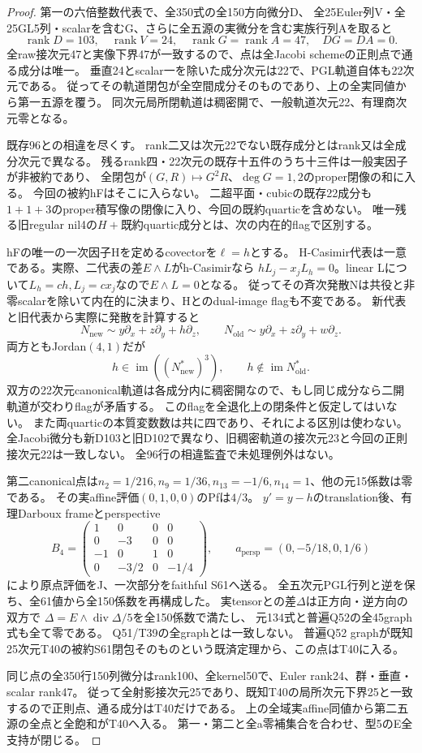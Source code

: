 \documentclass[a4paper,11pt]{ltjsarticle}
\theoremstyle{definition}
\begin{document}
\begin{proof}
第一の六倍整数代表で、全350式の全150方向微分D、
全25Euler列V・全25GL5列・scalarを含むG、さらに全五源の実微分を含む実族行列Aを取ると
\[
 \operatorname{rank}D=103,\quad\operatorname{rank}V=24,\quad
 \operatorname{rank}G=\operatorname{rank}A=47,\quad DG=DA=0.
\]
全raw接次元47と実像下界47が一致するので、点は全Jacobi schemeの正則点で通る成分は唯一。
垂直24とscalar一を除いた成分次元は22で、PGL軌道自体も22次元である。
従ってその軌道閉包が全空間成分そのものであり、上の全実同値から第一五源を覆う。
同次元局所閉軌道は稠密開で、一般軌道次元22、有理商次元零となる。

既存96との相違を尽くす。
rank二又は次元22でない既存成分とはrank又は全成分次元で異なる。
残るrank四・22次元の既存十五件のうち十三件は一般実因子が非被約であり、
全閉包が$(G,R)\mapsto G^2R$、$\deg G=1,2$のproper閉像の和に入る。
今回の被約hFはそこに入らない。
二超平面・cubicの既存22成分も$1+1+3$のproper積写像の閉像に入り、今回の既約quarticを含めない。
唯一残る旧regular nil4の$H+$既約quartic成分とは、次の内在的flagで区別する。

hFの唯一の一次因子Hを定めるcovectorを$\ell=h$とする。
H-Casimir代表は一意である。実際、二代表の差$E\wedge L$がh-Casimirなら
$hL_j-x_jL_h=0$。linear Lについて$L_h=ch,L_j=cx_j$なので$E\wedge L=0$となる。
従ってその斉次発散Nは共役と非零scalarを除いて内在的に決まり、Hとのdual-image flagも不変である。
新代表と旧代表から実際に発散を計算すると
\[
 N_{\mathrm{new}}\sim y\partial_x+z\partial_y+h\partial_z,\qquad
 N_{\mathrm{old}}\sim y\partial_x+z\partial_y+w\partial_z.
\]
両方ともJordan$(4,1)$だが
\[
 h\in\operatorname{im}((N_{\mathrm{new}}^*)^3),\qquad
 h\notin\operatorname{im}N_{\mathrm{old}}^*.
\]
双方の22次元canonical軌道は各成分内に稠密開なので、もし同じ成分なら二開軌道が交わりflagが矛盾する。
このflagを全退化上の閉条件と仮定してはいない。
また両quarticの本質変数数は共に四であり、それによる区別は使わない。
全Jacobi微分も新D103と旧D102で異なり、旧稠密軌道の接次元23と今回の正則接次元22は一致しない。
全96行の相違監査で未処理例外はない。

第二canonical点は$n_2=1/216,n_9=1/36,n_{13}=-1/6,n_{14}=1$、他の元15係数は零である。
その実affine評価$(0,1,0,0)$のPfは$4/3$。
$y'=y-h$のtranslation後、有理Darboux frameとperspective
\[
 B_4=\begin{pmatrix}1&0&0&0\\0&-3&0&0\\-1&0&1&0\\0&-3/2&0&-1/4\end{pmatrix},
 \qquad a_{\mathrm{persp}}=(0,-5/18,0,1/6)
\]
により原点評価をJ、一次部分をfaithful S61へ送る。
全五次元PGL行列と逆を保ち、全61値から全150係数を再構成した。
実tensorとの差$\Delta$は正方向・逆方向の双方で
$\Delta=E\wedge\operatorname{div}\Delta/5$を全150係数で満たし、
元134式と普遍Q52の全45graph式も全て零である。
Q51/T39の全graphとは一致しない。
普遍Q52 graphが既知25次元T40の被約S61閉包そのものという既済定理から、この点はT40に入る。

同じ点の全350行150列微分はrank100、全kernel50で、Euler rank24、群・垂直・scalar rank47。
従って全射影接次元25であり、既知T40の局所次元下界25と一致するので正則点、通る成分はT40だけである。
上の全域実affine同値から第二五源の全点と全飽和がT40へ入る。
第一・第二と全a零補集合を合わせ、型5のE全支持が閉じる。
\end{proof}
\end{document}
